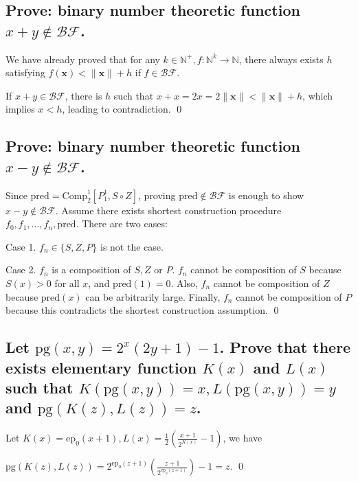 \documentclass[11pt]{article}
\begin{document}
\subsection{Prove: binary number theoretic function $x+y\notin\mathcal{BF}$.}
\begin{pf} \rm
 We have already proved that for any $k\in\mathbb{N}^+, f:\mathbb{N}^k\to\mathbb{N}$,
there always exists $h$ satisfying $f(\mathbf{x})<\|\mathbf{x}\|+h$ if $f\in\mathcal{BF}$.

If $x+y\in\mathcal{BF}$, there is $h$ such that
$x + x = 2x = 2\|\mathbf{x}\| < \|\mathbf{x}\| + h$,
which implies $x < h$, leading to contradiction. \qed

\end{pf}

\subsection{Prove: binary number theoretic function $x-y\notin\mathcal{BF}$.}
\begin{pf} \rm
Since $\mathrm{pred} = \mathrm{Comp}^1_2[P_1^1, S\circ Z]$, proving $\mathrm{pred}\notin
\mathcal{BF}$ is enough to show $x-y\notin\mathcal{BF}$.
Assume there exists shortest construction procedure
$f_0, f_1, \ldots, f_n, \mathrm{pred}$. There are two cases:

Case 1. $f_n\in\{S,Z,P\}$ is not the case.

Case 2. $f_n$ is a composition of $S,Z$ or $P$. $f_n$ cannot be composition of $S$ because
$S(x)>0$ for all $x$, and $\mathrm{pred}(1)=0$. Also, $f_n$ cannot be composition of 
$Z$ because $\mathrm{pred}(x)$
can be arbitrarily large. Finally, $f_n$ cannot be composition of $P$ because this contradicts
the shortest construction assumption. \qed

\end{pf}

\subsection{Let $\mathrm{pg}(x, y)=2^x(2y+1)-1$. Prove that there exists 
elementary function $K(x)$ and $L(x)$ such that $K(\mathrm{pg}(x, y)) = x,
L(\mathrm{pg}(x, y)) = y$ and $\mathrm{pg}(K(z),L(z))=z$.}

\begin{pf} \rm
 Let $\displaystyle K(x) = \mathrm{ep}_0 (x + 1), L(x) = 
\frac{1}{2} \left( \frac{x + 1}{2^{K(x)}} - 1 \right) $, we have
 
$\displaystyle \mathrm{pg}(K(z),L(z)) = 
2^{\mathrm{ep}_0(z+1)} \left( \frac{z + 1}{2^{\mathrm{ep}_0(z+1)}} \right) - 1
=z
$. \qed


\end{pf}
\end{document}
